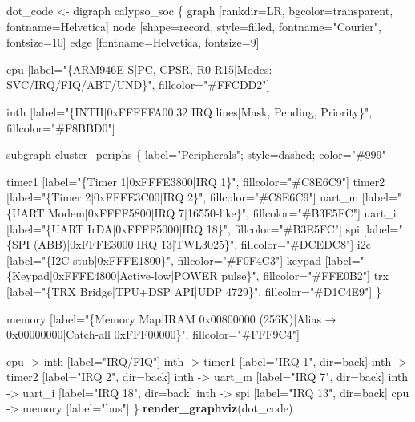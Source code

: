 \documentclass[
]{article}
\newenvironment{Shaded}{\begin{snugshade}}{\end{snugshade}}
\newcommand{\FunctionTok}[1]{\textcolor[rgb]{0.13,0.29,0.53}{\textbf{#1}}}
\newcommand{\NormalTok}[1]{#1}
\newcommand{\OtherTok}[1]{\textcolor[rgb]{0.56,0.35,0.01}{#1}}
\newcommand{\StringTok}[1]{\textcolor[rgb]{0.31,0.60,0.02}{#1}}
\begin{document}
\begin{Shaded}
\begin{Highlighting}[]
\NormalTok{dot\_code }\OtherTok{\textless{}{-}} \StringTok{\textquotesingle{}digraph calypso\_soc \{}
\StringTok{  graph [rankdir=LR, bgcolor=transparent, fontname=Helvetica]}
\StringTok{  node [shape=record, style=filled, fontname="Courier", fontsize=10]}
\StringTok{  edge [fontname=Helvetica, fontsize=9]}

\StringTok{  cpu [label="\{ARM946E{-}S|PC, CPSR, R0{-}R15|Modes: SVC/IRQ/FIQ/ABT/UND\}",}
\StringTok{       fillcolor="\#FFCDD2"]}

\StringTok{  inth [label="\{INTH|0xFFFFFA00|32 IRQ lines|Mask, Pending, Priority\}",}
\StringTok{        fillcolor="\#F8BBD0"]}

\StringTok{  subgraph cluster\_periphs \{}
\StringTok{    label="Peripherals"; style=dashed; color="\#999"}

\StringTok{    timer1 [label="\{Timer 1|0xFFFE3800|IRQ 1\}", fillcolor="\#C8E6C9"]}
\StringTok{    timer2 [label="\{Timer 2|0xFFFE3C00|IRQ 2\}", fillcolor="\#C8E6C9"]}
\StringTok{    uart\_m [label="\{UART Modem|0xFFFF5800|IRQ 7|16550{-}like\}", fillcolor="\#B3E5FC"]}
\StringTok{    uart\_i [label="\{UART IrDA|0xFFFF5000|IRQ 18\}", fillcolor="\#B3E5FC"]}
\StringTok{    spi    [label="\{SPI (ABB)|0xFFFE3000|IRQ 13|TWL3025\}", fillcolor="\#DCEDC8"]}
\StringTok{    i2c    [label="\{I2C stub|0xFFFE1800\}", fillcolor="\#F0F4C3"]}
\StringTok{    keypad [label="\{Keypad|0xFFFE4800|Active{-}low|POWER pulse\}", fillcolor="\#FFE0B2"]}
\StringTok{    trx    [label="\{TRX Bridge|TPU+DSP API|UDP 4729\}", fillcolor="\#D1C4E9"]}
\StringTok{  \}}

\StringTok{  memory [label="\{Memory Map|IRAM 0x00800000 (256K)|Alias → 0x00000000|Catch{-}all 0xFFF00000\}",}
\StringTok{          fillcolor="\#FFF9C4"]}

\StringTok{  cpu {-}\textgreater{} inth [label="IRQ/FIQ"]}
\StringTok{  inth {-}\textgreater{} timer1 [label="IRQ 1", dir=back]}
\StringTok{  inth {-}\textgreater{} timer2 [label="IRQ 2", dir=back]}
\StringTok{  inth {-}\textgreater{} uart\_m [label="IRQ 7", dir=back]}
\StringTok{  inth {-}\textgreater{} uart\_i [label="IRQ 18", dir=back]}
\StringTok{  inth {-}\textgreater{} spi [label="IRQ 13", dir=back]}
\StringTok{  cpu {-}\textgreater{} memory [label="bus"]}
\StringTok{\}\textquotesingle{}}
\FunctionTok{render\_graphviz}\NormalTok{(dot\_code)}
\end{Highlighting}
\end{Shaded}
\end{document}
